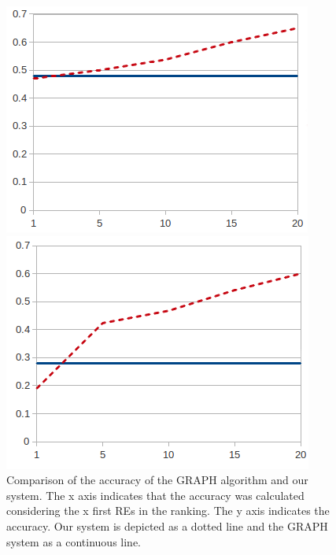 \begin{figure}[ht]
\begin{minipage}{0.50\linewidth}
\centering
\includegraphics[width=\textwidth]{images/furniturePrec.png}
\end{minipage}
\begin{minipage}{0.50\linewidth}
\centering
\includegraphics[width=\textwidth]{images/precP.png}
\end{minipage}
\caption{Comparison of the accuracy of the GRAPH algorithm and our system. The x axis indicates that the accuracy was calculated considering the x first REs in the ranking. The y axis indicates the accuracy. Our system is depicted as a dotted line and the GRAPH system as a continuous line.\label{graficoPresicion}}
\end{figure}

